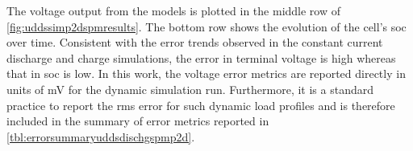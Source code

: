 
The  voltage  output   from  the  models  is  plotted  in   the  middle  row  of
\cref{fig:uddssimp2dspmresults}.  The  bottom row  shows  the  evolution of  the
cell's \gls{soc}  over time. Consistent  with the  error trends observed  in the
constant current discharge and charge simulations, the error in terminal voltage
is  high whereas  that in  \gls{soc} is  low. In  this work,  the voltage  error
metrics  are reported  directly in  units  of \si{\milli\volt}  for the  dynamic
simulation run. Furthermore,  it is a standard practice to  report the \gls{rms}
error for such dynamic load profiles and is therefore included in the summary of
error metrics reported in \cref{tbl:errorsummaryuddsdischgspmp2d}.




